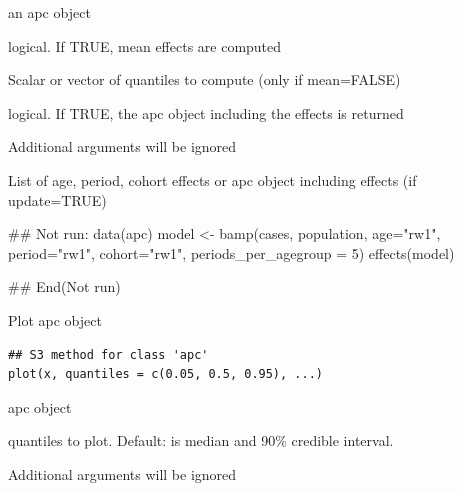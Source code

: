 \documentclass[a4paper]{book}
\begin{document}
%
\begin{Arguments}
\begin{ldescription}
\item[\code{object}] an apc object

\item[\code{mean}] logical. If TRUE, mean effects are computed

\item[\code{quantiles}] Scalar or vector of quantiles to compute (only if mean=FALSE)

\item[\code{update}] logical. If TRUE, the apc object including the effects is returned

\item[\code{...}] Additional arguments will be ignored
\end{ldescription}
\end{Arguments}
%
\begin{Value}
List of age, period, cohort effects or apc object including effects (if update=TRUE)
\end{Value}
%
\begin{Examples}
\begin{ExampleCode}
## Not run: 
data(apc)
model <- bamp(cases, population, age="rw1", period="rw1", cohort="rw1", periods_per_agegroup = 5)
effects(model)

## End(Not run)
\end{ExampleCode}
\end{Examples}
%
\begin{Description}
Plot apc object
\end{Description}
%
\begin{Usage}
\begin{verbatim}
## S3 method for class 'apc'
plot(x, quantiles = c(0.05, 0.5, 0.95), ...)
\end{verbatim}
\end{Usage}
%
\begin{Arguments}
\begin{ldescription}
\item[\code{x}] apc object

\item[\code{quantiles}] quantiles to plot. Default:  is median and 90\% credible interval.

\item[\code{...}] Additional arguments will be ignored
\end{ldescription}
\end{Arguments}
\end{document}

